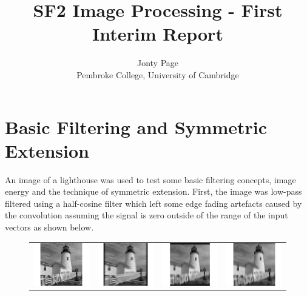 \documentclass{article}					%
\title{SF2 Image Processing - First Interim Report}
\author{Jonty Page\\ Pembroke College, University of Cambridge}
\begin{document}
\maketitle
\section{Basic Filtering and Symmetric Extension}
An image of a lighthouse was used to test some basic filtering concepts, image energy and the technique of symmetric extension. First, the image was low-pass filtered using a half-cosine filter which left some edge fading artefacts caused by the convolution assuming the signal is zero outside of the range of the input vectors as shown below.
\begin{figure}[ht!]
\begin{centering}
\begin{tabular}{c c c c}
  \includegraphics{1} & \includegraphics{2} & \includegraphics{3} & \includegraphics{4}\\

\end{tabular}
\end{centering}
\end{figure}
\end{document}
